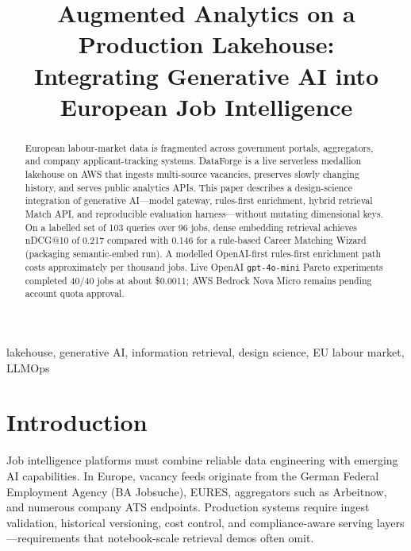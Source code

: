 \documentclass[conference]{IEEEtran}
\begin{document}
\title{Augmented Analytics on a Production Lakehouse:\\Integrating Generative AI into European Job Intelligence}

\author{
}

\maketitle

\begin{abstract}
European labour-market data is fragmented across government portals, aggregators, and company applicant-tracking systems.
DataForge is a live serverless medallion lakehouse on AWS that ingests multi-source vacancies, preserves slowly changing history, and serves public analytics APIs.
This paper describes a design-science integration of generative AI---model gateway, rules-first enrichment, hybrid retrieval Match API, and reproducible evaluation harness---without mutating dimensional keys.
On a labelled set of 103 queries over 96 jobs, dense embedding retrieval achieves nDCG@10 of 0.217 compared with 0.146 for a rule-based Career Matching Wizard (packaging semantic-embed run).
A modelled OpenAI-first rules-first enrichment path costs approximately  per thousand jobs.
Live OpenAI \texttt{gpt-4o-mini} Pareto experiments completed 40/40 jobs at about \$0.0011; AWS Bedrock Nova Micro remains pending account quota approval.
\end{abstract}

\begin{IEEEkeywords}
lakehouse, generative AI, information retrieval, design science, EU labour market, LLMOps
\end{IEEEkeywords}

\section{Introduction}
\label{sec:intro}

Job intelligence platforms must combine reliable data engineering with emerging AI capabilities.
In Europe, vacancy feeds originate from the German Federal Employment Agency (BA Jobsuche), EURES, aggregators such as Arbeitnow, and numerous company ATS endpoints.
Production systems require ingest validation, historical versioning, cost control, and compliance-aware serving layers---requirements that notebook-scale retrieval demos often omit.
\end{document}
